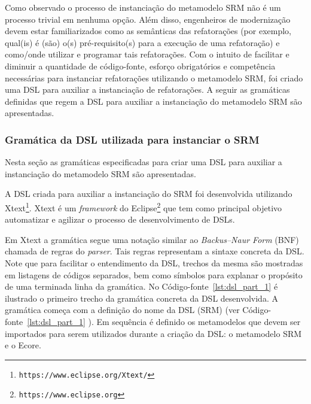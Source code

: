 Como observado o processo de instanciação do metamodelo SRM não é um processo trivial em nenhuma opção. Além disso, engenheiros de modernização devem estar familiarizados como as semânticas das refatorações (por exemplo, qual(is) é (são) o(s) pré-requisito(s) para a execução de uma refatoração) e como/onde utilizar e programar tais refatorações. Com o intuito de facilitar e diminuir a quantidade de código-fonte, esforço obrigatórios e competência necessárias para instanciar refatorações utilizando o metamodelo SRM, foi criado uma DSL para auxiliar a instanciação de refatorações. A seguir as gramáticas definidas que regem a DSL para auxiliar a instanciação do metamodelo SRM são apresentadas.

\subsubsection{Gramática da DSL utilizada para instanciar o SRM}

Nesta seção as gramáticas especificadas para criar uma DSL para auxiliar a instanciação do metamodelo SRM são apresentadas.
%

A DSL criada para auxiliar a instanciação do SRM foi desenvolvida utilizando Xtext\footnote{\texttt{https://www.eclipse.org/Xtext/}}. Xtext é um \textit{framework} do Eclipse\footnote{\texttt{https://www.eclipse.org}} que tem como principal objetivo automatizar e agilizar o processo de desenvolvimento de DSLs. %

Em Xtext a gramática segue uma notação similar ao \textit{Backus–Naur Form} (BNF) chamada de regras do \textit{parser}. Tais regras representam a sintaxe concreta da DSL. Note que para facilitar o entendimento da DSL, trechos da mesma são mostradas em listagens de códigos separados, bem como símbolos para explanar o propósito de uma terminada linha da gramática. No Código-fonte~\ref{lst:dsl_part_1} é ilustrado o primeiro trecho da gramática concreta da DSL desenvolvida. A gramática começa com a definição do nome da DSL (SRM) (ver Código-fonte~\ref{lst:dsl_part_1} ). Em sequência é definido os metamodelos que devem ser importados para serem utilizados durante a criação da DSL: o metamodelo SRM e o Ecore.


